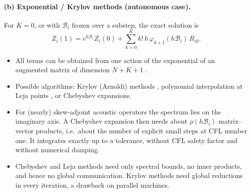 \documentclass[11pt,a4paper]{article}
\theoremstyle{definition}
\theoremstyle{remark}
\begin{document}
\paragraph{(b) Exponential / Krylov methods (autonomous case).}
For $K=0$, or with $\mathcal B_i$ frozen over a substep, the exact
solution is
\begin{equation*}
 Z_i(1)=e^{h\mathcal B_i}Z_i(0)+\sum_{k=0}^Kk!\,h\,\varphi_{k+1}(h\mathcal B_i)\,R_{ik}.
\end{equation*}
\begin{itemize}
\item All terms can be obtained from one action of the exponential of an
  augmented matrix of dimension $N+K+1$
  \cite{Sidje1998,AlMohyHigham2011}.
\item Possible algorithms: Krylov (Arnoldi) methods \cite{NiesenWright2012,GaudreaultRainwaterTokman2018},
  polynomial interpolation at Leja points \cite{CaliariKandolfOstermannRainer2014},
  or Chebyshev expansions.
\item For (nearly) skew-adjoint acoustic operators the spectrum lies on
  the imaginary axis. A Chebyshev expansion then needs about
  $\rho(h\mathcal B_i)$ matrix--vector products, i.e.\ about the number
  of explicit small steps at CFL number one. It integrates exactly up to
  a tolerance, without CFL safety factor and without numerical damping.
\item Chebyshev and Leja methods need only spectral bounds, no inner
  products, and hence no global communication. Krylov methods need
  global reductions in every iteration, a drawback on parallel machines.
\end{itemize}
\end{document}
